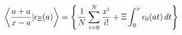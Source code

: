 $$\left\langle {a + a \over x - a} | \epsilon_\Xi(a) \right\rangle = \left\{ \frac{1}{N} \sum_{i=0}^N \frac{x^i}{i!} + \Xi \int_0^x \epsilon_0(at) \, dt \right\}$$
